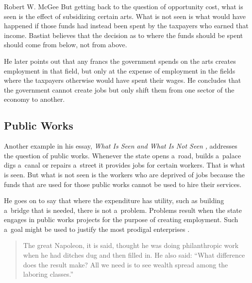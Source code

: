\begin{artengenv}{Robert W. McGee}
But getting back to the question of opportunity cost, what is seen is the effect of subsidizing certain arts. What is not seen is what would have happened if those funds had instead been spent by the taxpayers who earned that income. Bastiat believes that the decision as to where the funds should be spent should come from below, not from above.



He later points out that any francs the government spends on the arts creates employment in that field, but only at the expense of employment in the fields where the taxpayers otherwise would have spent their wages. He concludes that the government cannot create jobs but only shift them from one sector of the economy to another.



\subsection{Public Works}



Another example in his essay, \textit{What Is Seen and What Is Not Seen} 
\parencite[][]{bastiat_selected_1964}%
\textit{,} addresses the question of public works. Whenever the state opens a~road, builds a~palace digs a~canal or repairs a~street it provides jobs for certain workers. That is what is seen. But what is not seen is the workers who are deprived of jobs because the funds that are used for those public works cannot be used to hire their services.



He goes on to say that where the expenditure has utility, such as building a~bridge that is needed, there is not a~problem. Problems result when the state engages in public works projects for the purpose of creating employment. Such a~goal might be used to justify the most prodigal enterprises 
\parencite[][p.17]{bastiat_selected_1964}.%




\begin{quote}
The great Napoleon, it is said, thought he was doing philanthropic work when he had ditches dug and then filled in. He also said: ``What difference does the result make? All we need is to see wealth spread among the laboring classes.'' 
\parencite[][p.18]{bastiat_selected_1964}%
\end{quote}





\end{artengenv}
